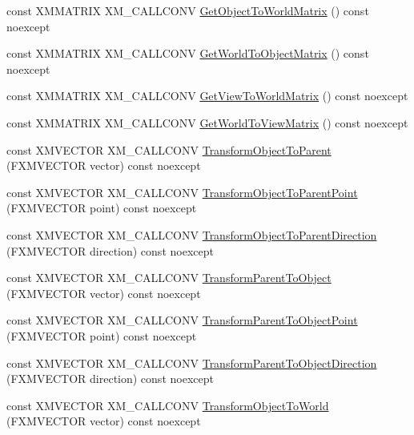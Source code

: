 \begin{DoxyCompactItemize}
\item 
const X\+M\+M\+A\+T\+R\+IX X\+M\+\_\+\+C\+A\+L\+L\+C\+O\+NV \hyperlink{classmage_1_1_transform_af26e8771a10357032391a0a5f88a56fb}{Get\+Object\+To\+World\+Matrix} () const noexcept
\item 
const X\+M\+M\+A\+T\+R\+IX X\+M\+\_\+\+C\+A\+L\+L\+C\+O\+NV \hyperlink{classmage_1_1_transform_af415c8f2b8d22e69df2878044b9414c5}{Get\+World\+To\+Object\+Matrix} () const noexcept
\item 
const X\+M\+M\+A\+T\+R\+IX X\+M\+\_\+\+C\+A\+L\+L\+C\+O\+NV \hyperlink{classmage_1_1_transform_a93b1f562a9f1358d40232424b1e9a3b8}{Get\+View\+To\+World\+Matrix} () const noexcept
\item 
const X\+M\+M\+A\+T\+R\+IX X\+M\+\_\+\+C\+A\+L\+L\+C\+O\+NV \hyperlink{classmage_1_1_transform_a0ed2ed133c816d8d2066dc83025f9f95}{Get\+World\+To\+View\+Matrix} () const noexcept
\item 
const X\+M\+V\+E\+C\+T\+OR X\+M\+\_\+\+C\+A\+L\+L\+C\+O\+NV \hyperlink{classmage_1_1_transform_a622f8234d70768c33a3cbb8fa50932cc}{Transform\+Object\+To\+Parent} (F\+X\+M\+V\+E\+C\+T\+OR vector) const noexcept
\item 
const X\+M\+V\+E\+C\+T\+OR X\+M\+\_\+\+C\+A\+L\+L\+C\+O\+NV \hyperlink{classmage_1_1_transform_a2d93dac4ae0b5b2723d2fbce077da85f}{Transform\+Object\+To\+Parent\+Point} (F\+X\+M\+V\+E\+C\+T\+OR point) const noexcept
\item 
const X\+M\+V\+E\+C\+T\+OR X\+M\+\_\+\+C\+A\+L\+L\+C\+O\+NV \hyperlink{classmage_1_1_transform_afddbd41527257bf0ed20ceafa19b49c9}{Transform\+Object\+To\+Parent\+Direction} (F\+X\+M\+V\+E\+C\+T\+OR direction) const noexcept
\item 
const X\+M\+V\+E\+C\+T\+OR X\+M\+\_\+\+C\+A\+L\+L\+C\+O\+NV \hyperlink{classmage_1_1_transform_a305841f6bbc0a4eadaacbce2918b438c}{Transform\+Parent\+To\+Object} (F\+X\+M\+V\+E\+C\+T\+OR vector) const noexcept
\item 
const X\+M\+V\+E\+C\+T\+OR X\+M\+\_\+\+C\+A\+L\+L\+C\+O\+NV \hyperlink{classmage_1_1_transform_a4b420feb6f839d045a0239056b47772d}{Transform\+Parent\+To\+Object\+Point} (F\+X\+M\+V\+E\+C\+T\+OR point) const noexcept
\item 
const X\+M\+V\+E\+C\+T\+OR X\+M\+\_\+\+C\+A\+L\+L\+C\+O\+NV \hyperlink{classmage_1_1_transform_a0f84d13bf0016a6c98d84ccf0d357b50}{Transform\+Parent\+To\+Object\+Direction} (F\+X\+M\+V\+E\+C\+T\+OR direction) const noexcept
\item 
const X\+M\+V\+E\+C\+T\+OR X\+M\+\_\+\+C\+A\+L\+L\+C\+O\+NV \hyperlink{classmage_1_1_transform_a9d560741131cf68503e725346d681991}{Transform\+Object\+To\+World} (F\+X\+M\+V\+E\+C\+T\+OR vector) const noexcept

\end{DoxyCompactItemize}
